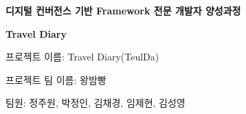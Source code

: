 
\begin{titlepage}
   \begin{flushleft}
      \vspace*{3.5cm}

      \centering 
      
      \textbf{\LARGE{디지털 컨버전스 기반 Framework 전문 개발자 양성과정}}

      \vspace{0.5cm}

      \textbf{{\fontsize{60}{48} \selectfont\color{myred}Travel Diary}}
          
      \vspace{1cm}


      \vfill

      \raggedleft\large
      프로젝트 이름: Travel Diary(TeulDa)

      프로젝트 팀 이름: 왕밤빵

      팀원: 정주원, 박정인, 김채경, 임제현, 김성영
      \normalsize

   \end{flushleft}
\end{titlepage}

\begingroup
  \pagestyle{empty}
  \null
  \newpage
  \null
  \newpage
  \null
  \newpage
\endgroup
